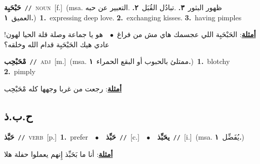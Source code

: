 \documentclass[10pt,a4paper,twoside]{article} %
\begin{document}
\begin{multicols}{2}
{\setlength\topsep{0pt}\textbf{\foreignlanguage{arabic}{حَبْحَبِة}}\ {\color{gray}\texttt{//}\color{black}}\ \textsc{noun}\ [f.]\ \color{gray}(msa. \foreignlanguage{arabic}{ظهور البثور}~\foreignlanguage{arabic}{\textbf{٣.}}  .\foreignlanguage{arabic}{تبادُل القُبَل}~\foreignlanguage{arabic}{\textbf{٢.}}  .\foreignlanguage{arabic}{التعبير عن حبه العميق}~\foreignlanguage{arabic}{\textbf{١.}})\color{black}\ \textbf{1.}~expressing deep love.  \textbf{2.}~exchanging kisses.  \textbf{3.}~having pimples\  \begin{flushright}\color{gray}\foreignlanguage{arabic}{\textbf{\underline{\foreignlanguage{arabic}{أمثلة}}}: الحَبْحَبِة اللي عجسمك هاي مش من فراغ\ $\bullet$\ \  هو يا جماعة وصلة قلة الحيا لهون! عادي هيك الحَبْحَبِة قدام الله وخلقه؟}\end{flushright}\color{black}} \vspace{2mm}

{\setlength\topsep{0pt}\textbf{\foreignlanguage{arabic}{مْحَبْحِب}}\ {\color{gray}\texttt{//}\color{black}}\ \textsc{adj}\ [m.]\ \color{gray}(msa. \foreignlanguage{arabic}{ممتلئ بالحبوب أو البقع الحمراء}~\foreignlanguage{arabic}{\textbf{١.}})\color{black}\ \textbf{1.}~blotchy  \textbf{2.}~pimply\  \begin{flushright}\color{gray}\foreignlanguage{arabic}{\textbf{\underline{\foreignlanguage{arabic}{أمثلة}}}: رجعت من غربا وجهها كله مْحَبْحِب}\end{flushright}\color{black}} \vspace{2mm}

\vspace{-3mm}
\subsection*{\color{blue}\foreignlanguage{arabic}{ح.ب.ذ}\color{blue}{}} 

{\setlength\topsep{0pt}\textbf{\foreignlanguage{arabic}{حَبَّذ}}\ {\color{gray}\texttt{//}\color{black}}\ \textsc{verb}\ [p.]\ \textbf{1.}~prefer\ \ $\bullet$\ \ \setlength\topsep{0pt}\textbf{\foreignlanguage{arabic}{حَبِّذ}}\ {\color{gray}\texttt{//}\color{black}}\ [c.]\ \ $\bullet$\ \ \setlength\topsep{0pt}\textbf{\foreignlanguage{arabic}{يحَبِّذ}}\ {\color{gray}\texttt{//}\color{black}}\ [i.]\ \color{gray}(msa. \foreignlanguage{arabic}{يُفَضِّل}~\foreignlanguage{arabic}{\textbf{١.}})\color{black}\  \begin{flushright}\color{gray}\foreignlanguage{arabic}{\textbf{\underline{\foreignlanguage{arabic}{أمثلة}}}: أنا ما بَحَبِّذ إِنهم يعملوا حفلة هلا}\end{flushright}\color{black}} \vspace{2mm}


\end{multicols}
\end{document}
